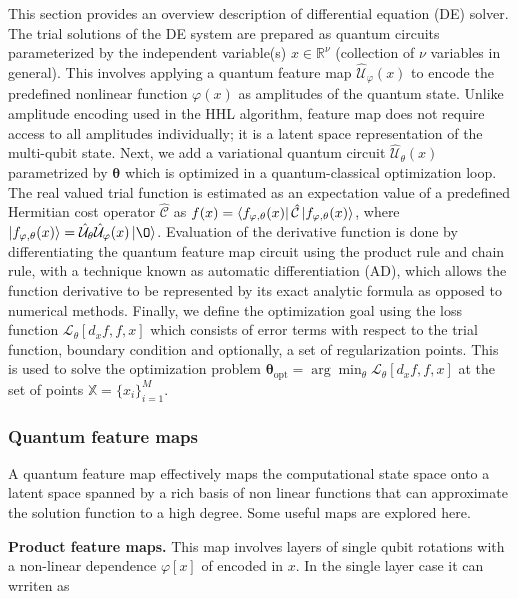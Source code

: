 \documentclass[11pt,a4paper]{article}
\begin{document}
This section provides an overview description of differential equation (DE) solver. The trial solutions of the DE system are prepared as quantum circuits parameterized by the independent variable(s) $x \in \mathbb{R}^{\nu}$ (collection of $\nu$ variables in general). This involves applying a quantum feature map $\hat{\mathcal{U}}_\varphi(x)$ to encode the predefined nonlinear function $\varphi(x)$ as amplitudes of the quantum state. Unlike amplitude encoding used in the HHL algorithm, feature map does not require access to all amplitudes individually; it is a latent space representation of the multi-qubit state. Next, we add a variational quantum circuit $\hat{\mathcal{U}}_\theta(x)$ parametrized by $\boldsymbol{\theta}$ which is optimized in a quantum-classical optimization loop. The real valued trial function is estimated as an expectation value of a predefined Hermitian cost operator $\hat{\mathcal{C}}$ as $f(x) = \bra{f_{\varphi,\theta}(x)}\hat{\mathcal{C}}\ket{f_{\varphi,\theta}(x)}$, where $\ket{f_{\varphi,\theta}(x)} = \hat{\mathcal{U}}_\theta\hat{\mathcal{U}}_\varphi(x) \ket{\O}$. Evaluation of the derivative function is done by differentiating the quantum feature map circuit using the product rule and chain rule, with a technique known as automatic differentiation (AD), which allows the function derivative to be represented by its exact analytic formula as opposed to numerical methods. Finally, we define the optimization goal using the loss function $\mathcal{L}_\theta[d_x f, f, x]$ which consists of error terms with respect to the trial function, boundary condition and optionally, a set of regularization points. This is used to solve the optimization problem $\boldsymbol{\theta}_\text{opt} = \arg\min_\theta \mathcal{L}_\theta[d_x f, f, x]$ at the set of points $\mathbb{X} = \{x_i\}_{i=1}^M$.

\subsubsection{Quantum feature maps}

A quantum feature map effectively maps the computational state space onto a latent space spanned by a rich basis of non linear functions that can approximate the solution function to a high degree. Some useful maps are explored here.

\textbf{Product feature maps.} This map involves layers of single qubit rotations with a non-linear dependence $\varphi[x]$ of encoded in $x$. In the single layer case it can wrriten as
\end{document}
